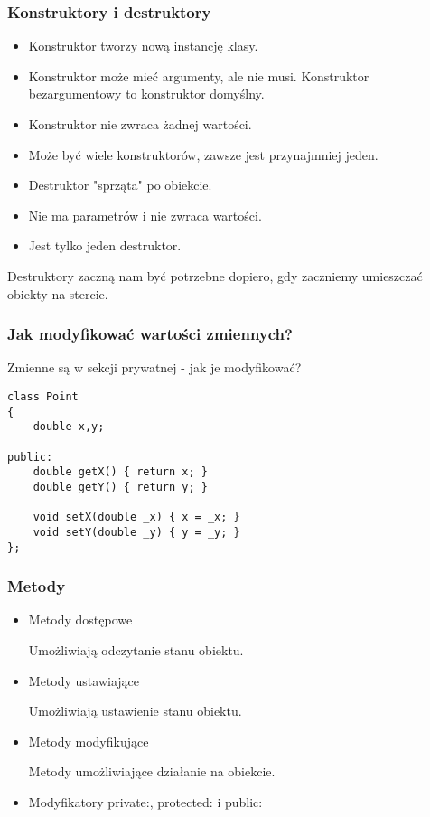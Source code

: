 \documentclass[pdftex, smaller]{beamer}
\begin{document}
\begin{frame}
\frametitle{Konstruktory i destruktory}

\begin{itemize}
\item Konstruktor tworzy nową instancję klasy.
\item Konstruktor może mieć argumenty, ale nie musi. Konstruktor bezargumentowy to konstruktor domyślny.
\item Konstruktor nie zwraca żadnej wartości.
\item Może być wiele konstruktorów, zawsze jest przynajmniej jeden.
\end{itemize}

\begin{itemize}
\item Destruktor "sprząta" po obiekcie.
\item Nie ma parametrów i nie zwraca wartości.
\item Jest tylko jeden destruktor.
\end{itemize}

Destruktory zaczną nam  być potrzebne dopiero, gdy zaczniemy umieszczać obiekty na stercie.
\end{frame}

\begin{frame}[fragile]
\frametitle{Jak modyfikować wartości zmiennych?}

Zmienne są w sekcji prywatnej - jak je modyfikować?

\begin{lstlisting}
class Point
{
	double x,y;
    
public:
	double getX() { return x; }
	double getY() { return y; }
	
	void setX(double _x) { x = _x; }
	void setY(double _y) { y = _y; }
};
\end{lstlisting}

\end{frame}

\begin{frame}
\frametitle{Metody}

\begin{itemize}
\item Metody dostępowe

\vspace{2mm}
Umożliwiają odczytanie stanu obiektu.
\item Metody ustawiające

\vspace{2mm}
Umożliwiają ustawienie stanu obiektu.

\item Metody modyfikujące

\vspace{2mm}
Metody umożliwiające działanie na obiekcie.

\item Modyfikatory private:, protected: i public:
\end{itemize}

\end{frame}
\end{document}
